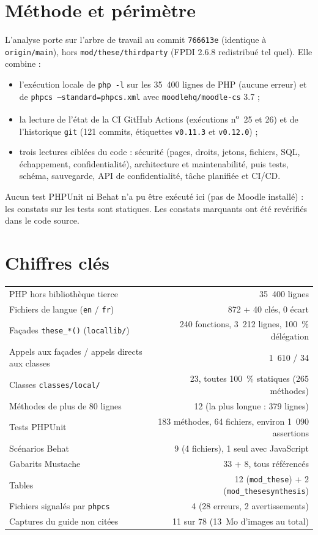 \documentclass[11pt,a4paper]{article}
\newcommand{\fichier}[1]{\texttt{\small #1}}
\newcommand{\code}[1]{\texttt{#1}}
\begin{document}
\section{Méthode et périmètre}

L'analyse porte sur l'arbre de travail au commit \code{766613e} (identique à \code{origin/main}),
hors \fichier{mod/these/thirdparty} (FPDI 2.6.8 redistribué tel quel). Elle combine :
\begin{itemize}
  \item l'exécution locale de \code{php -l} sur les 35~400 lignes de PHP (aucune erreur) et de
    \code{phpcs --standard=phpcs.xml} avec \code{moodlehq/moodle-cs} 3.7 ;
  \item la lecture de l'état de la CI GitHub Actions (exécutions n\textsuperscript{o}~25 et 26)
    et de l'historique \code{git} (121 commits, étiquettes \code{v0.11.3} et \code{v0.12.0}) ;
  \item trois lectures ciblées du code : sécurité (pages, droits, jetons, fichiers, SQL,
    échappement, confidentialité), architecture et maintenabilité, puis tests, schéma,
    sauvegarde, API de confidentialité, tâche planifiée et CI/CD.
\end{itemize}
Aucun test PHPUnit ni Behat n'a pu être exécuté ici (pas de Moodle installé) : les constats sur
les tests sont statiques. Les constats marquants ont été revérifiés dans le code source.

\section{Chiffres clés}

\begin{center}
\begin{tabular}{lr}
\toprule
PHP hors bibliothèque tierce & 35~400 lignes \\
Fichiers de langue (\code{en} / \code{fr}) & 872 + 40 clés, 0 écart \\
Façades \code{these\_*()} (\fichier{locallib/}) & 240 fonctions, 3~212 lignes, 100~\% délégation \\
Appels aux façades / appels directs aux classes & 1~610 / 34 \\
Classes \fichier{classes/local/} & 23, toutes 100~\% statiques (265 méthodes) \\
Méthodes de plus de 80 lignes & 12 (la plus longue : 379 lignes) \\
Tests PHPUnit & 183 méthodes, 64 fichiers, environ 1~090 assertions \\
Scénarios Behat & 9 (4 fichiers), 1 seul avec JavaScript \\
Gabarits Mustache & 33 + 8, tous référencés \\
Tables & 12 (\code{mod\_these}) + 2 (\code{mod\_thesesynthesis}) \\
Fichiers signalés par \code{phpcs} & 4 (28 erreurs, 2 avertissements) \\
Captures du guide non citées & 11 sur 78 (13~Mo d'images au total) \\
\bottomrule
\end{tabular}
\end{center}
\end{document}
